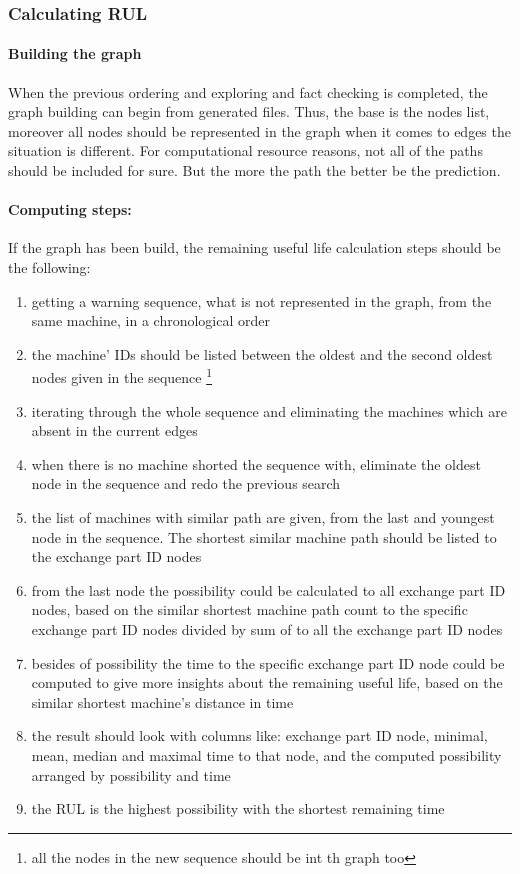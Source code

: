		\subsubsection{Calculating RUL}
			\paragraph{Building the graph}
			When the previous ordering and exploring and fact checking is completed, the graph building can begin from generated files. Thus, the base is the nodes list, moreover all nodes should be represented in the graph when it comes to edges the situation is different. For computational resource reasons, not all of the paths should be included for sure. But the more the path the better be the prediction.
			\paragraph{Computing steps:}
			If the graph has been build, the remaining useful life calculation steps should be the following:
			\begin{enumerate}
				\item{getting a warning sequence, what is not represented in the graph, from the same machine, in a chronological order}
				\item{the machine' IDs should be listed between the oldest and the second oldest nodes given in the sequence} \footnote{all the nodes in the new sequence should be int th graph too} 
				\item{iterating through the whole sequence and eliminating the machines which are absent in the current edges}
				\item{when there is no machine shorted the sequence with, eliminate the oldest node in the sequence and redo the previous search}
				\item{the list of machines with similar path are given, from the last and youngest node in the sequence. The shortest similar machine path should be listed to the exchange part ID nodes}
				\item{from the last node the possibility could be calculated to all exchange part ID nodes, based on the similar shortest machine path count to the specific exchange part ID nodes divided by sum of to all the exchange part ID nodes}
				\item{besides of possibility the time to the specific exchange part ID node could be computed to give more insights about the remaining useful life, based on the similar shortest machine's distance in time}
				\item{the result should look with columns like: exchange part ID node, minimal, mean, median and maximal time to that node, and the computed possibility arranged by possibility and time} 
		 		\item{the RUL is the highest possibility with the shortest remaining time}
		 	\end{enumerate}
		
